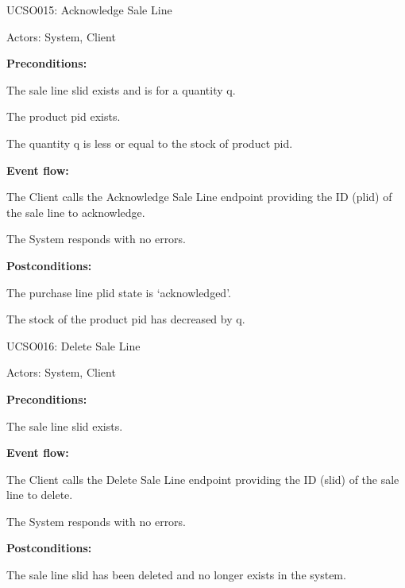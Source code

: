 \begin{ucbox}{UCSO015: Acknowledge Sale Line}
\label{UCSO015}

Actors: System, Client

\textbf{Preconditions:}

\ucitem The sale line slid exists and is for a quantity q.

\ucitem The product pid exists.

\ucitem The quantity q is less or equal to the stock of product pid.

\textbf{Event flow:}

\ucitem The Client calls the Acknowledge Sale Line endpoint providing the ID (plid) of the sale line to acknowledge.

\ucitem The System responds with no errors.

\textbf{Postconditions:}

\ucitem The purchase line plid state is ‘acknowledged’.

\ucitem The stock of the product pid has decreased by q.

\end{ucbox}

\begin{ucbox}{UCSO016: Delete Sale Line}
\label{UCSO016}

Actors: System, Client

\textbf{Preconditions:}

\ucitem The sale line slid exists.

\textbf{Event flow:}

\ucitem The Client calls the Delete Sale Line endpoint providing the ID (slid) of the sale line to delete.

\ucitem The System responds with no errors.

\textbf{Postconditions:}

\ucitem The sale line slid has been deleted and no longer exists in the system.

\end{ucbox}
\newpage